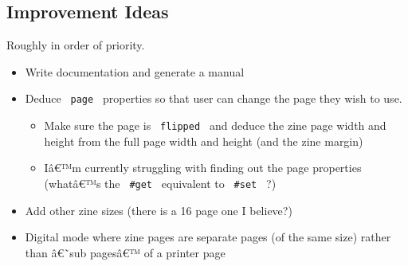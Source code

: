 \begin{Shaded}
\begin{Highlighting}[]


\NormalTok{    number =\textgreater{} [}
\NormalTok{    ]}
\NormalTok{  )}
\NormalTok{)}

\NormalTok{)}
\end{Highlighting}
\end{Shaded}


\subsection{Improvement Ideas}\label{improvement-ideas}

Roughly in order of priority.

\begin{itemize}
\tightlist
\item
  Write documentation and generate a manual
\item
  Deduce \texttt{\ page\ } properties so that user can change the page
  they wish to use.

  \begin{itemize}
  \tightlist
  \item
    Make sure the page is \texttt{\ flipped\ } and deduce the zine page
    width and height from the full page width and height (and the zine
    margin)
  \item
    Iâ€™m currently struggling with finding out the page properties
    (whatâ€™s the \texttt{\ \#get\ } equivalent to \texttt{\ \#set\ } ?)
  \end{itemize}
\item
  Add other zine sizes (there is a 16 page one I believe?)
\item
  Digital mode where zine pages are separate pages (of the same size)
  rather than â€˜sub pagesâ€™ of a printer page
\end{itemize}

